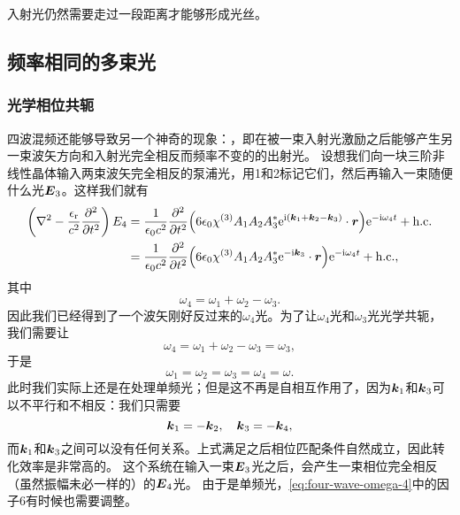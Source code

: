 入射光仍然需要走过一段距离才能够形成光丝。

\subsection{频率相同的多束光}

\subsubsection{光学相位共轭}

四波混频还能够导致另一个神奇的现象：，即在被一束入射光激励之后能够产生另一束波矢方向和入射光完全相反而频率不变的的出射光。
设想我们向一块三阶非线性晶体输入两束波矢完全相反的泵浦光，用1和2标记它们，然后再输入一束随便什么光$\vb*{E}_3$。这样我们就有
\begin{equation}
    \begin{aligned}
        \left( \laplacian - \frac{\epsilon_\text{r}}{c^2} \pdv[2]{t} \right) E_4 &= \frac{1}{\epsilon_0 c^2} \pdv[2]{t} (6 \epsilon_0 \chi^{(3)} A_1 A_2 A_3^* \ee^{\ii (\vb*{k}_1 + \vb*{k}_2 - \vb*{k}_3)} \cdot \vb*{r}) \ee^{- \ii \omega_4 t} + \text{h.c.} \\
        &= \frac{1}{\epsilon_0 c^2} \pdv[2]{t} (6 \epsilon_0 \chi^{(3)} A_1 A_2 A_3^* \ee^{- \ii \vb*{k}_3} \cdot \vb*{r}) \ee^{- \ii \omega_4 t} + \text{h.c.} ,
    \end{aligned}
    \label{eq:four-wave-omega-4}
\end{equation}
其中
\begin{equation}
    \omega_4 = \omega_1 + \omega_2 - \omega_3.
\end{equation}
因此我们已经得到了一个波矢刚好反过来的$\omega_4$光。为了让$\omega_4$光和$\omega_3$光光学共轭，我们需要让
\[
    \omega_4 = \omega_1 + \omega_2 - \omega_3 = \omega_3,
\]
于是
\begin{equation}
    \omega_1 = \omega_2 = \omega_3 = \omega_4 = \omega.
\end{equation}
此时我们实际上还是在处理单频光；但是这不再是自相互作用了，因为$\vb*{k}_1$和$\vb*{k}_3$可以不平行和不相反：我们只需要
\begin{equation}
    \vb*{k}_1 = - \vb*{k}_2, \quad \vb*{k}_3 = - \vb*{k}_4,
\end{equation}
而$\vb*{k}_1$和$\vb*{k}_3$之间可以没有任何关系。上式满足之后相位匹配条件自然成立，因此转化效率是非常高的。
这个系统在输入一束$\vb*{E}_3$光之后，会产生一束相位完全相反（虽然振幅未必一样的）的$\vb*{E}_4$光。
由于是单频光，\eqref{eq:four-wave-omega-4}中的因子$6$有时候也需要调整。


